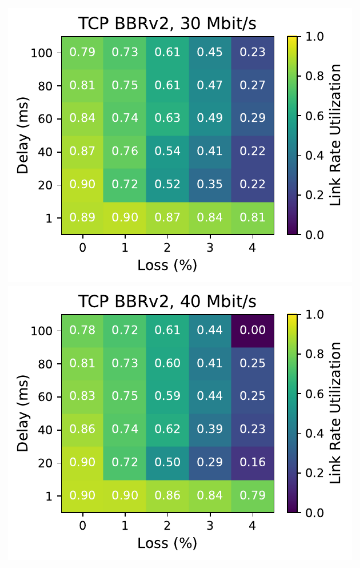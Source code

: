 \begin{figure}[ht]
\begin{subfigure}[b]{0.22\linewidth}
        \includegraphics[width=\linewidth,trim={0 0 2cm 0},clip]{splitting-paper/figures/heatmaps/heatmap_tcp_bbr2_30mbps.pdf}
        \includegraphics[width=\linewidth,trim={0 0 2cm 0},clip]{splitting-paper/figures/heatmaps/heatmap_tcp_bbr2_40mbps.pdf}

\end{subfigure}
\end{figure}
